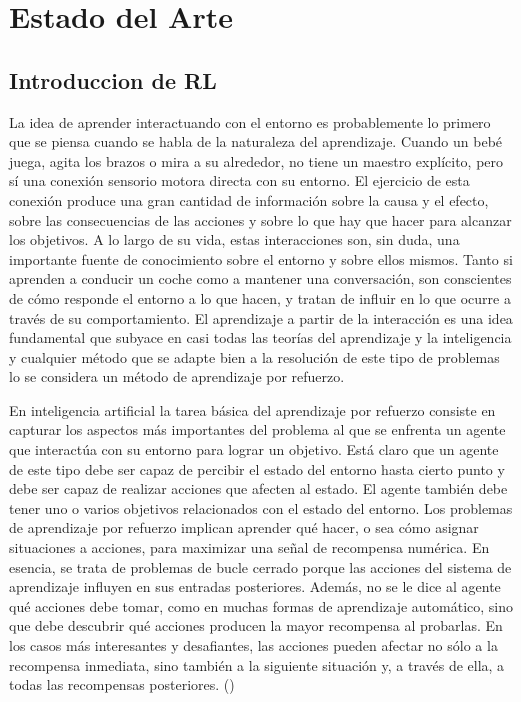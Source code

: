 \chapter{Estado del Arte}\label{chapter:state-of-the-art}

\section{Introduccion de RL}\label{section:state-of-the-art:introduction-to-RL}

La idea de aprender interactuando con el entorno es probablemente lo primero que se piensa cuando se habla de la naturaleza del aprendizaje. Cuando un bebé juega, agita los brazos o mira a su alrededor, no tiene un maestro explícito, pero sí una conexión sensorio motora directa con su entorno. El ejercicio de esta conexión produce una gran cantidad de información sobre la causa y el efecto, sobre las consecuencias de las acciones y sobre lo que hay que hacer para alcanzar los objetivos. A lo largo de su vida, estas interacciones son, sin duda, una importante fuente de conocimiento sobre el entorno y sobre ellos mismos. Tanto si aprenden a conducir un coche como a mantener una conversación, son conscientes de cómo responde el entorno a lo que hacen, y tratan de influir en lo que ocurre a través de su comportamiento. El aprendizaje a partir de la interacción es una idea fundamental que subyace en casi todas las teorías del aprendizaje y la inteligencia y cualquier método que se adapte bien a la resolución de este tipo de problemas lo se considera un método de aprendizaje por refuerzo.

En inteligencia artificial la tarea básica del aprendizaje por refuerzo consiste en capturar los aspectos más importantes del problema al que se enfrenta un agente que interactúa con su entorno para lograr un objetivo. Está claro que un agente de este tipo debe ser capaz de percibir el estado del entorno hasta cierto punto y debe ser capaz de realizar acciones que afecten al estado. El agente también debe tener uno o varios objetivos relacionados con el estado del entorno. Los problemas de aprendizaje por refuerzo implican aprender qué hacer, o sea cómo asignar situaciones a acciones, para maximizar una señal de recompensa numérica. En esencia, se trata de problemas de bucle cerrado porque las acciones del sistema de aprendizaje influyen en sus entradas posteriores. Además, no se le dice al agente qué acciones debe tomar, como en muchas formas de aprendizaje automático, sino que debe descubrir qué acciones producen la mayor recompensa al probarlas. En los casos más interesantes y desafiantes, las acciones pueden afectar no sólo a la recompensa inmediata, sino también a la siguiente situación y, a través de ella, a todas las recompensas posteriores. (\cite{sutton1998introduction})

